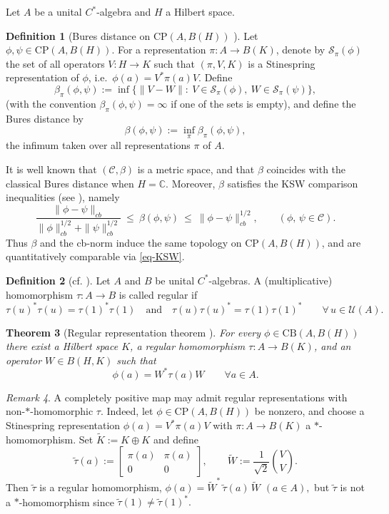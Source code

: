 \documentclass[11pt]{amsart}
\newtheorem{theorem}{Theorem}[section]
\theoremstyle{definition}
\newtheorem{definition}[theorem]{Definition}
\theoremstyle{remark}
\newtheorem{remark}[theorem]{Remark}
\newcommand{\U}{\mathcal U}
\newcommand{\1}{\mathbbm{1}}
\newcommand{\CP}{\mathrm{CP}}
\newcommand{\CB}{\mathrm{CB}}
\begin{document}
Let $A$ be a unital $C^*$-algebra and $H$ a Hilbert space.
\begin{definition}
[Bures distance on $\CP(A,B(H))$ {\cite[Def.\ 1]{KSW}}]
\label{def:bures}
Let $\phi,\psi\in \CP(A,B(H))$.
For a representation $\pi:A\to B(K)$, denote by $\mathscr S_\pi(\phi)$ the set of all operators $V:H\to K$
such that $(\pi,V,K)$ is a Stinespring representation of $\phi$, i.e.\ $\phi(a)=V^*\pi(a)V$.
Define
\[
\beta_\pi(\phi,\psi):=\inf\{\|V-W\|:\ V\in \mathscr S_\pi(\phi),\ W\in\mathscr S_\pi(\psi)\},
\]
(with the convention $\beta_\pi(\phi,\psi)=\infty$ if one of the sets is empty), and define the Bures distance by
\[
\beta(\phi,\psi):=\inf_{\pi}\beta_\pi(\phi,\psi),
\]
the infimum taken over all representations $\pi$ of $A$.
\end{definition}

It is well known that $(\mathcal C,\beta)$ is a metric space, and that $\beta$  coincides with the classical Bures distance when 
$H=\mathbb{C}$. Moreover, $\beta$ satisfies the KSW comparison inequalities (see \cite[Th.\ 1]{KSW}), namely 
\begin{equation}\label{eq-KSW}
\frac{\|\phi-\psi\|_{cb}}{\|\phi\|_{cb}^{1/2}+\|\psi\|_{cb}^{1/2}}
\ \le\
\beta (\phi,\psi)
\ \le\
\|\phi-\psi\|_{cb}^{1/2}, \qquad (\phi,\,\psi\in \mathcal C).
\end{equation}
Thus $\beta$ and the cb-norm induce the same topology on  $\CP(A,B(H))$, and are quantitatively comparable via \eqref{eq-KSW}.

\begin{definition}[cf. {\cite[Def.\ 2.7]{BMS2017}}]
Let $A$ and $B$ be unital $C^*$-algebras.
A (multiplicative) homomorphism $\tau:A\to B$ is called regular if
\[
\tau(u)^*\tau(u)=\tau(1)^*\tau(1)
\quad\text{and}\quad
\tau(u)\tau(u)^*=\tau(1)\tau(1)^*
\qquad \forall\, u\in \U(A).
\]
\end{definition}

\begin{theorem}[Regular representation theorem {\cite[Thm.\ 3.2]{BMS2017}}]\label{thm:BMS-3-2}
For every $\phi\in \CB(A,B(H))$ there exist a Hilbert space $K$, a regular homomorphism
$\tau:A\to B(K)$, and an operator $W\in B(H,K)$ such that
\[
\phi(a)=W^*\tau(a)W\qquad\forall a\in A.
\]
\end{theorem}
%

\begin{remark}
\label{rem:fixed-regular-representation-false}
A completely positive map may admit regular representations with
non-$*$-homomorphic $\tau$. Indeed, let $\phi\in\CP(A,B(H))$ be nonzero, and choose a Stinespring
representation $\phi(a)=V^*\pi(a)V$
with $\pi:A\to B(K)$ a $*$-homomorphism.
Set $\widetilde K:=K\oplus K$ and define
\[
\widetilde\tau(a):=
\begin{bmatrix}
\pi(a) & \pi(a)\\
0 & 0
\end{bmatrix},
\qquad
\widetilde W:=\frac{1}{\sqrt2}\binom{V}{V}.
\]
Then $\widetilde\tau$ is a regular homomorphism, $\phi(a)=\widetilde W^*\,\widetilde\tau(a)\,\widetilde W$ $(a\in A),$
but $\widetilde\tau$ is not a $*$-homomorphism since
$\widetilde\tau(1)
\neq
\widetilde\tau(1)^*.$
\end{remark}
\end{document}
